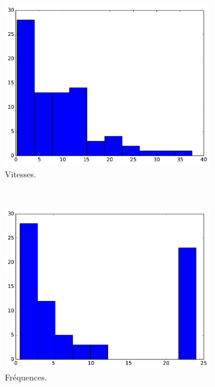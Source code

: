 \begin{appendices}
	\begin{figure}[htbp]
		\begin{subfigure}[t]{\subImgWclicks}
			\centering
			\includegraphics[width=\textwidth]{figures/ch3/bird_filteredSpeed}
			\caption{Vitesses.}
			\label{fig:bird_filteredSpeed}
		\end{subfigure}
		~
		\begin{subfigure}[t]{\subImgWclicks}
			\centering
			\includegraphics[width=\textwidth]{figures/ch3/bird_frequency}
			\caption{Fréquences.}
			\label{fig:bird_frequency}
		\end{subfigure}
		~
		\begin{subfigure}[t]{\subImgWclicks}

\end{subfigure}
\end{figure}
\end{appendices}
